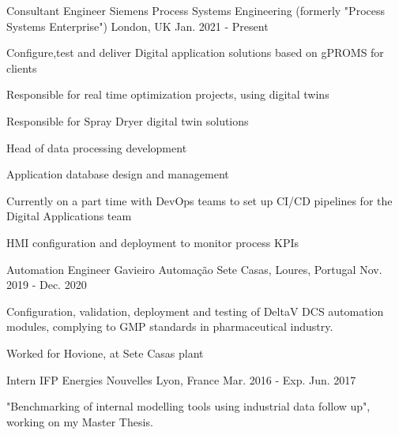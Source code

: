 

\begin{cventries}

  \cventry
    {Consultant Engineer} %
    {Siemens Process Systems Engineering (formerly "Process Systems Enterprise")} %
    {London, UK} %
    {Jan. 2021 - Present} %
    {
      \begin{cvitems} %
        \item {Configure,test and deliver Digital application solutions based on gPROMS for clients}
        \item {Responsible for real time optimization projects, using digital twins}
        \item {Responsible for Spray Dryer digital twin solutions}
        \item {Head of data processing development}
        \item {Application database design and management}
        \item {Currently on a part time with DevOps teams to set up CI/CD pipelines for the Digital Applications team}
        \item {HMI configuration and deployment to monitor process KPIs}
      \end{cvitems}
    }

  \cventry
    {Automation Engineer} %
    {Gavieiro Automação} %
    {Sete Casas, Loures, Portugal} %
    {Nov. 2019 - Dec. 2020} %
    {
      \begin{cvitems} %
        \item {Configuration, validation, deployment and testing of DeltaV DCS automation modules, complying to GMP standards in pharmaceutical industry.}
        \item {Worked for Hovione, at Sete Casas plant}
      \end{cvitems}
    }

  \cventry
    {Intern} %
    {IFP Energies Nouvelles} %
    {Lyon, France} %
    {Mar. 2016 - Exp. Jun. 2017} %
    {
      \begin{cvitems} %
        \item {"Benchmarking of internal modelling tools using industrial data follow up", working on my Master Thesis.}
      \end{cvitems}
    }


\end{cventries}
